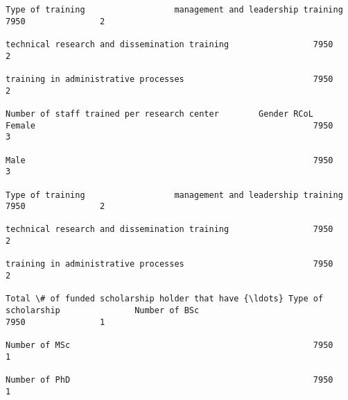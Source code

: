 \documentclass[11pt]{article}
\begin{document}
\begin{Verbatim}[commandchars=\\\{\}]
                                                                                                                            Type of training                  management and leadership training                            7950               2  
                                                                                                                                                              technical research and dissemination training                 7950               2  
                                                                                                                                                              training in administrative processes                          7950               2  
                                                                         Number of staff trained per research center        Gender RCoL                       Female                                                        7950               3  
                                                                                                                                                              Male                                                          7950               3  
                                                                                                                            Type of training                  management and leadership training                            7950               2  
                                                                                                                                                              technical research and dissemination training                 7950               2  
                                                                                                                                                              training in administrative processes                          7950               2  
                                                                         Total \# of funded scholarship holder that have {\ldots} Type of scholarship               Number of BSc                                                 7950               1  
                                                                                                                                                              Number of MSc                                                 7950               1  
                                                                                                                                                              Number of PhD                                                 7950               1  

\end{Verbatim}
\end{document}

